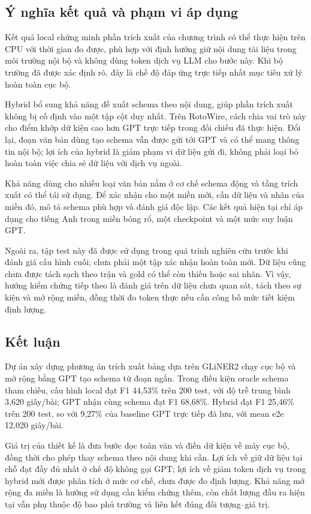 \subsection{Ý nghĩa kết quả và phạm vi áp dụng}
Kết quả local chứng minh phần trích xuất của chương trình có thể thực hiện trên CPU với thời gian đo được, phù hợp với định hướng giữ nội dung tài liệu trong môi trường nội bộ và không dùng token dịch vụ LLM cho bước này. Khi bộ trường đã được xác định rõ, đây là chế độ đáp ứng trực tiếp nhất mục tiêu xử lý hoàn toàn cục bộ.

Hybrid bổ sung khả năng đề xuất schema theo nội dung, giúp phần trích xuất không bị cố định vào một tập cột duy nhất. Trên RotoWire, cách chia vai trò này cho điểm khớp dữ kiện cao hơn GPT trực tiếp trong đối chiếu đã thực hiện. Đổi lại, đoạn văn bản dùng tạo schema vẫn được gửi tới GPT và có thể mang thông tin nội bộ; lợi ích của hybrid là giảm phạm vi dữ liệu gửi đi, không phải loại bỏ hoàn toàn việc chia sẻ dữ liệu với dịch vụ ngoài.

Khả năng dùng cho nhiều loại văn bản nằm ở cơ chế schema động và tầng trích xuất có thể tái sử dụng. Để xác nhận cho một miền mới, cần dữ liệu và nhãn của miền đó, mô tả schema phù hợp và đánh giá độc lập. Các kết quả hiện tại chỉ áp dụng cho tiếng Anh trong miền bóng rổ, một checkpoint và một mức suy luận GPT.

Ngoài ra, tập test này đã được sử dụng trong quá trình nghiên cứu trước khi đánh giá cấu hình cuối; chưa phải một tập xác nhận hoàn toàn mới. Dữ liệu cũng chưa được tách sạch theo trận và gold có thể còn thiếu hoặc sai nhãn. Vì vậy, hướng kiểm chứng tiếp theo là đánh giá trên dữ liệu chưa quan sát, tách theo sự kiện và mở rộng miền, đồng thời đo token thực nếu cần công bố mức tiết kiệm định lượng.

\subsection{Kết luận}
Dự án xây dựng phương án trích xuất bảng dựa trên GLiNER2 chạy cục bộ và mở rộng bằng GPT tạo schema từ đoạn ngắn. Trong điều kiện oracle schema tham chiếu, cấu hình local đạt F1 44,53\% trên 200 test, với độ trễ trung bình 3,620 giây/bài; GPT nhận cùng schema đạt F1 68,68\%. Hybrid đạt F1 25,46\% trên 200 test, so với 9,27\% của baseline GPT trực tiếp đã lưu, với mean e2e 12,020 giây/bài.

Giá trị của thiết kế là đưa bước đọc toàn văn và điền dữ kiện về máy cục bộ, đồng thời cho phép thay schema theo nội dung khi cần. Lợi ích về giữ dữ liệu tại chỗ đạt đầy đủ nhất ở chế độ không gọi GPT; lợi ích về giảm token dịch vụ trong hybrid mới được phân tích ở mức cơ chế, chưa được đo định lượng. Khả năng mở rộng đa miền là hướng sử dụng cần kiểm chứng thêm, còn chất lượng đầu ra hiện tại vẫn phụ thuộc độ bao phủ trường và liên kết đúng đối tượng--giá trị.
